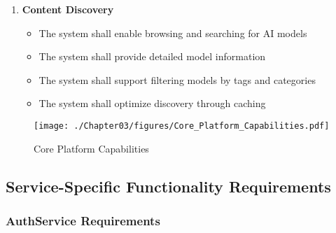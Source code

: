 \begin{enumerate}
   \item \textbf{Content Discovery}
   \begin{itemize}
      \item The system shall enable browsing and searching for AI models
      \item The system shall provide detailed model information
      \item The system shall support filtering models by tags and categories
      \item The system shall optimize discovery through caching
   \end{itemize}
\end{enumerate}

\begin{sidewaysfigure}[p]
    \centering
    \texttt{[image: ./Chapter03/figures/Core\_Platform\_Capabilities.pdf]}
    \caption{Core Platform Capabilities}
    \label{fig:platform-capabilities}
\end{sidewaysfigure}
\clearpage

\subsection{Service-Specific Functionality Requirements}

\subsubsection*{AuthService Requirements}


